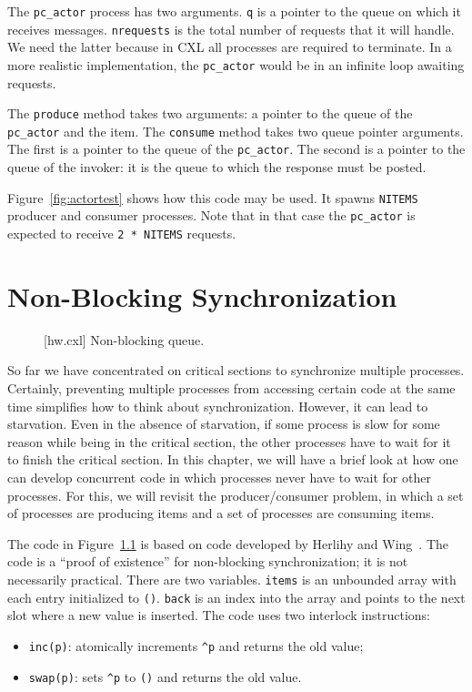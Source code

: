 \documentclass{report}
\newenvironment{code}{
\tcolorbox
}{
\endtcolorbox
}
\begin{document}
The \texttt{pc\_actor} process has two arguments.  \texttt{q} is a pointer
to the queue on which it receives messages.  \texttt{nrequests} is the total
number of requests that it will handle.  We need the latter because in CXL
all processes are required to terminate.  In a more realistic implementation,
the \texttt{pc\_actor} would be in an infinite loop awaiting requests.

The \texttt{produce} method takes two arguments: a pointer to the queue
of the \texttt{pc\_actor} and the item.  The \texttt{consume} method
takes two queue pointer arguments.  The first is a pointer to the queue
of the \texttt{pc\_actor}.  The second is a pointer to the queue of the
invoker: it is the queue to which the response must be posted.

Figure~\ref{fig:actortest} shows how this code may be used.  It spawns
\texttt{NITEMS} producer and consumer processes.  Note that in that
case the \texttt{pc\_actor} is expected to receive \texttt{2 * NITEMS}
requests.

\chapter{Non-Blocking Synchronization}

\begin{figure}
\begin{code}
\end{code}
\caption{[hw.cxl] Non-blocking queue.}
\label{fig:hw}
\end{figure}

So far we have concentrated on critical sections to synchronize multiple
processes.  Certainly, preventing multiple processes from accessing
certain code at the same time simplifies how to think about synchronization.
However, it can lead to starvation.  Even in the absence of starvation,
if some process is slow for some reason while being in the critical section,
the other processes have to wait for it to finish the critical section.
In this chapter, we will have a brief look at how one can develop concurrent
code in which processes never have to wait for other processes.
For this, we will revisit the producer/consumer problem, in which a
set of processes are producing items and a set of processes are
consuming items.

The code in Figure~\ref{fig:hw} is based on code developed by Herlihy and
Wing~\cite{HW87}.
The code is a ``proof of existence'' for non-blocking synchronization; it
is not necessarily practical.
There are two variables.  \texttt{items} is an unbounded array with each
entry initialized to \texttt{()}.  \texttt{back} is an index into the
array and points to the next slot where a new value is inserted.
The code uses two interlock instructions:
\begin{itemize}
\item \texttt{inc(p)}: atomically increments \texttt{\^{}p} and returns
the old value;
\item \texttt{swap(p)}: sets \texttt{\^{}p} to \texttt{()} and returns
the old value.
\end{itemize}
\end{document}
